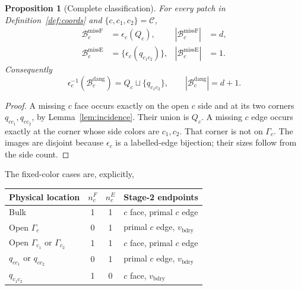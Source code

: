 \documentclass[11pt]{article}
\theoremstyle{definition}
\theoremstyle{plain}
\newtheorem{proposition}[definition]{Proposition}
\theoremstyle{remark}
\newcommand{\C}{\mathcal C}
\newcommand{\bd}{v_{\mathrm{bdry}}}
\newcommand{\eps}{\epsilon}
\newcommand{\dang}{\mathrm{dang}}
\newcommand{\missF}{\mathrm{missF}}
\newcommand{\missE}{\mathrm{missE}}
\begin{document}
\begin{proposition}[Complete classification]
\label{prop:classification}
For every patch in Definition~\ref{def:coords} and
$\{c,c_1,c_2\}=\C$,
\begin{align}
 \mathcal B_c^{\missF}&=\eps_c(Q_c),&
 |\mathcal B_c^{\missF}|&=d,\label{eq:sideclass}\\
 \mathcal B_c^{\missE}&=\{\eps_c(q_{c_1c_2})\},&
 |\mathcal B_c^{\missE}|&=1.\label{eq:cornerclass}
\end{align}
Consequently
\[
 \eps_c^{-1}(\mathcal B_c^{\dang})
   =Q_c\sqcup\{q_{c_1c_2}\},\qquad
 |\mathcal B_c^{\dang}|=d+1.
\]
\end{proposition}
\begin{proof}
A missing $c$ face occurs exactly on the open $c$ side and at its
two corners $q_{cc_1},q_{cc_2}$, by Lemma~\ref{lem:incidence}.
Their union is $Q_c$.
A missing $c$ edge occurs exactly at the corner whose side colors are
$c_1,c_2$. That corner is not on $\Gamma_c$.
The images are disjoint because $\eps_c$ is a labelled-edge bijection;
their sizes follow from the side count.
\end{proof}

The fixed-color cases are, explicitly,
\begin{center}
\begin{tabular}{@{}lccp{42mm}@{}}
\toprule
Physical location & $n_c^F$ & $n_c^E$ & Stage-2 endpoints\\
\midrule
Bulk & 1 & 1 & $c$ face, primal $c$ edge\\
Open $\Gamma_c$ & 0 & 1 & primal $c$ edge, $\bd$\\
Open $\Gamma_{c_1}$ or $\Gamma_{c_2}$ & 1 & 1 & $c$ face, primal $c$ edge\\
$q_{cc_1}$ or $q_{cc_2}$ & 0 & 1 & primal $c$ edge, $\bd$\\
$q_{c_1c_2}$ & 1 & 0 & $c$ face, $\bd$\\
\bottomrule
\end{tabular}
\end{center}
\end{document}
